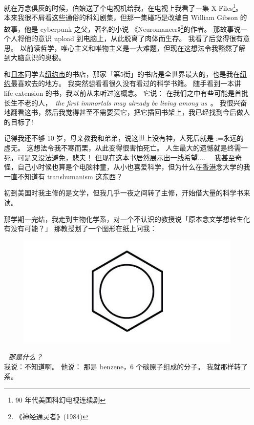 \documentclass[12pt]{report}
\makeatletter
\newcommand{\cc}[2]{#1}
\newcommand{\cc}[2]{#2}
\newcommand{\tab}{\hspace*{1cm}}
\newcommand{\speechEn}[1]{\textrm{\textit{\ #1\ }}}
\newcommand{\speechCn}[1]{\textrm{\textit{\textcolor{Speech}{#1}}}}
\renewcommand{\d}[1]{$\underaccent{\scalebox{0.5}{\textbullet}}{\textrm{#1}}$}
\newcommand{\ds}[1]{%
  \@tfor\next:=#1\do{\d{\next}}}
\newcommand*\dashh{\,\,\textemdash\kern-1pt\textemdash\,\,}
\makeatother
\begin{document}
\cc{
就在万念俱灰的时候，伯娘送了个电视机给我，在电视上我看了一集 X-Files\footnote{90 年代美国科幻电视连续剧}。 本来我很不屑看这些通俗的科幻剧集，但那一集碰巧是改编自 William Gibson 的故事，他是 cyberpunk 之父，著名的小说 《Neuromancer》\footnote{《神经通灵者》(1984)}的作者。 那故事说一个人将他的意识 upload 到电脑上，从此脱离了肉体而生存。 我看了后觉得很有意思。 以前读哲学，唯心主义和唯物主义是一大难题，但现在这想法令我豁然了解到大脑意识的奥秘。 
}{
	
}

\cc{
和\uline{日本}同学去\uline{纽约市}的书店，那家「第5街」的书店是全世界最大的，也是我在\uline{纽约}最喜欢去的地方。 我突然想看看很久没有看过的科学书籍。 随手看到一本讲 life extension 的书，我以前从未听过这概念。 它说： 在我们之中有些可能是首批长生不老的人，\speechEn{the first immortals may already be living among us}。 我很兴奋地翻看这书，然后我觉得甚至不需要买它，把它插回书架上，我已经找到今后做人的目标了!
}{
	
}

\cc{
记得我还不够 10 岁，母亲教我和弟弟，说这世上没有神，人死后就是\ds{永远的虚无}。 这想法令我不寒而栗，从此变得很害怕死亡。 人生最大的遗憾就是终需一死，可是又没法避免，悲夫！  但现在这本书居然展示出一线希望....~~  我甚至奇怪，自己小时候也算是个电脑神童，从小也喜爱科学，但为什么在\uline{香港}念大学的我一直不知道有 transhumanism 这东西？
}{
	
}

\cc{
初到美国时我主修的是文学，但我几乎一夜之间转了主修，开始借大量的科学书来读。
}{
	
}

\cc{
那学期一完结，我走到生物化学系，对一个不认识的教授说「原本念文学想转生化有没有可能？」 那教授划了一个图形在纸上问我：
}{
	
}
\begin{figure}[H]
\centering
\includegraphics[scale=0.4]{benzene.jpg}
\end{figure}
\vspace{-1cm}
\cc{
\tab \dashh \speechCn{那是什么？}\\
我说：不知道啊。 他说： 那是 benzene，6 个碳原子组成的分子。  我就那样转了系。
}{
	
}
\end{document}
